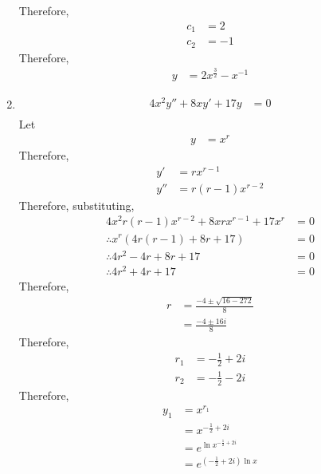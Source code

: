 \documentclass[fleqn, a4paper, 11pt, oneside]{amsart}
\theoremstyle{definition}
\theoremstyle{theorem}
\begin{document}
\begin{solution}
\begin{enumerate}[leftmargin = *]
			Therefore,
			\begin{align*}
				c_1 & = 2 \\
				c_2 & = -1
			\end{align*}
			Therefore,
			\begin{align*}
				y & = 2 x^{\frac{3}{2}} - x^{-1}
			\end{align*}
		\item
			\begin{align*}
				4 x^2 y'' + 8 x y' + 17 y & = 0 \\
			\end{align*}
			Let
			\begin{align*}
				y & = x^r
			\end{align*}
			Therefore,
			\begin{align*}
				y'  & = r x^{r - 1} \\
				y'' & = r (r - 1) x^{r - 2}
			\end{align*}
			Therefore, substituting,
			\begin{align*}
				4 x^2 r (r - 1) x^{r - 2} + 8 x r x^{r - 1} + 17 x^r & = 0 \\
				\therefore x^r \left( 4 r (r - 1) + 8 r + 17 \right) & = 0 \\
				\therefore 4 r^2 - 4 r + 8 r + 17                    & = 0 \\
				\therefore 4 r^2 + 4 r + 17                          & = 0
			\end{align*}
			Therefore,
			\begin{align*}
				r & = \frac{-4 \pm \sqrt{16 - 272}}{8} \\
                                  & = \frac{-4 \pm 16 i}{8}
			\end{align*}
			Therefore,
			\begin{align*}
				r_1 & = -\frac{1}{2} + 2 i \\
				r_2 & = -\frac{1}{2} - 2 i
			\end{align*}
			Therefore,
			\begin{align*}
				y_1 & = x^{r_1}                                                          \\
                                    & = x^{-\frac{1}{2} + 2 i}                                           \\
                                    & = e^{\ln x^{-\frac{1}{2} + 2 i}}                                   \\
                                    & = e^{\left( -\frac{1}{2} + 2 i \right) \ln x}                      \\

\end{align*}
\end{enumerate}
\end{solution}
\end{document}
